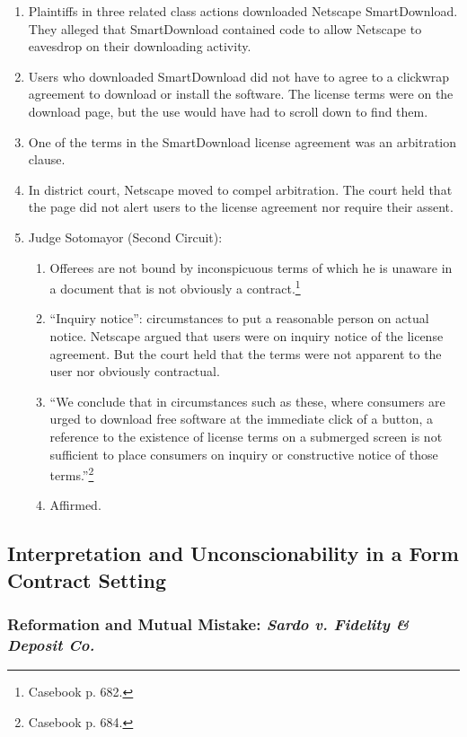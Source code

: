 \begin{enumerate}
    \item Plaintiffs in three related class actions downloaded Netscape 
    SmartDownload. They alleged that SmartDownload contained code to allow 
    Netscape to eavesdrop on their downloading activity.
    \item Users who downloaded SmartDownload did not have to agree to a 
    clickwrap agreement to download or install the software. The license terms 
    were on the download page, but the use would have had to scroll down to 
    find them.
    \item One of the terms in the SmartDownload license agreement was an 
    arbitration clause.
    \item In district court, Netscape moved to compel arbitration. The court 
    held that the page did not alert users to the license agreement nor 
    require their assent.
    \item Judge Sotomayor (Second Circuit):
    \begin{enumerate}
        \item Offerees are not bound by inconspicuous terms of which he is 
        unaware in a document that is not obviously a 
        contract.\footnote{Casebook p. 682.}
        \item ``Inquiry notice'': circumstances to put a reasonable person on 
        actual notice. Netscape argued that users were on inquiry notice of 
        the license agreement. But the court held that the terms were not 
        apparent to the user nor obviously contractual.
        \item ``We conclude that in circumstances such as these, where 
        consumers are urged to download free software at the immediate click 
        of a button, a reference to the existence of license terms on a 
        submerged screen is not sufficient to place consumers on inquiry or 
        constructive notice of those terms.''\footnote{Casebook p. 684.}
        \item Affirmed.
    \end{enumerate}
\end{enumerate}

\subsection{Interpretation and Unconscionability in a Form Contract Setting}

\subsubsection{Reformation and Mutual Mistake: \emph{Sardo v. Fidelity \& 
Deposit Co.}}

